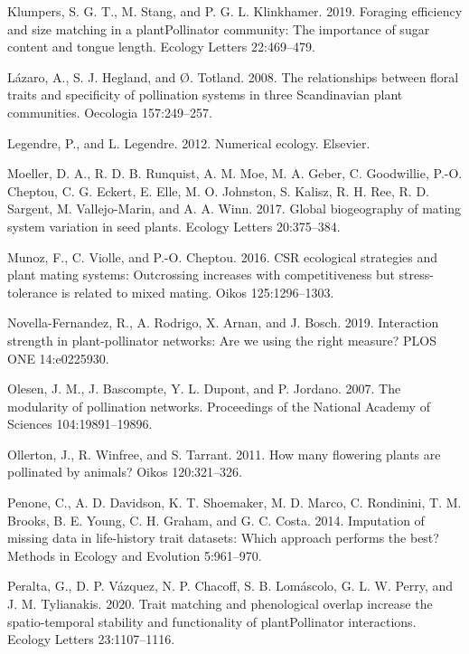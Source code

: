 \documentclass[12pt,a4paper,]{article}
\begin{document}
\hypertarget{ref-klumpers2019}{}
Klumpers, S. G. T., M. Stang, and P. G. L. Klinkhamer. 2019. Foraging
efficiency and size matching in a plantPollinator community: The
importance of sugar content and tongue length. Ecology Letters
22:469--479.

\hypertarget{ref-lazaro2008}{}
Lázaro, A., S. J. Hegland, and Ø. Totland. 2008. The relationships
between floral traits and specificity of pollination systems in three
Scandinavian plant communities. Oecologia 157:249--257.

\hypertarget{ref-legendre2012}{}
Legendre, P., and L. Legendre. 2012. Numerical ecology. Elsevier.

\hypertarget{ref-moeller2017}{}
Moeller, D. A., R. D. B. Runquist, A. M. Moe, M. A. Geber, C.
Goodwillie, P.-O. Cheptou, C. G. Eckert, E. Elle, M. O. Johnston, S.
Kalisz, R. H. Ree, R. D. Sargent, M. Vallejo-Marin, and A. A. Winn.
2017. Global biogeography of mating system variation in seed plants.
Ecology Letters 20:375--384.

\hypertarget{ref-munoz2016}{}
Munoz, F., C. Violle, and P.-O. Cheptou. 2016. CSR ecological strategies
and plant mating systems: Outcrossing increases with competitiveness but
stress-tolerance is related to mixed mating. Oikos 125:1296--1303.

\hypertarget{ref-novella-fernandez2019}{}
Novella-Fernandez, R., A. Rodrigo, X. Arnan, and J. Bosch. 2019.
Interaction strength in plant-pollinator networks: Are we using the
right measure? PLOS ONE 14:e0225930.

\hypertarget{ref-olesen2007}{}
Olesen, J. M., J. Bascompte, Y. L. Dupont, and P. Jordano. 2007. The
modularity of pollination networks. Proceedings of the National Academy
of Sciences 104:19891--19896.

\hypertarget{ref-ollerton2011}{}
Ollerton, J., R. Winfree, and S. Tarrant. 2011. How many flowering
plants are pollinated by animals? Oikos 120:321--326.

\hypertarget{ref-penone2014}{}
Penone, C., A. D. Davidson, K. T. Shoemaker, M. D. Marco, C. Rondinini,
T. M. Brooks, B. E. Young, C. H. Graham, and G. C. Costa. 2014.
Imputation of missing data in life-history trait datasets: Which
approach performs the best? Methods in Ecology and Evolution 5:961--970.

\hypertarget{ref-peralta2020}{}
Peralta, G., D. P. Vázquez, N. P. Chacoff, S. B. Lomáscolo, G. L. W.
Perry, and J. M. Tylianakis. 2020. Trait matching and phenological
overlap increase the spatio-temporal stability and functionality of
plantPollinator interactions. Ecology Letters 23:1107--1116.
\end{document}
